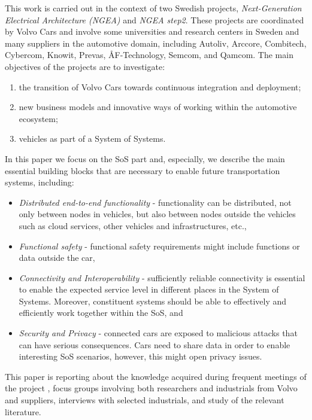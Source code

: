 This work is carried out in the context of two Swedish projects, {\em Next-Generation Electrical Architecture (NGEA)} and {\em NGEA step2}. 
These projects are coordinated by Volvo Cars and involve some universities and research centers in Sweden and many suppliers in the automotive domain, including Autoliv, Arccore, Combitech, Cybercom, Knowit, Prevas, \AA F-Technology, Semcom, and Qamcom. %
The main objectives of the projects are to investigate:
	\begin{enumerate} %
		\item the transition of Volvo Cars towards continuous integration and deployment;
		\item new business models and innovative ways of working within the automotive ecosystem; 
		\item vehicles as part of a System of Systems.
	\end{enumerate}


In this paper we focus on the SoS part and, especially, we describe the main essential building blocks that are necessary to enable future transportation systems, including: 

\begin{itemize}
\item {\em Distributed end-to-end functionality} - functionality can be distributed, not only between nodes in vehicles, but also between nodes outside the vehicles such as cloud services, other vehicles and infrastructures, etc., 
\item {\em Functional safety} - functional safety requirements might include functions or data outside the car, 
\item {\em Connectivity and Interoperability} - sufficiently reliable connectivity is essential to enable the expected service level in different places in the System of Systems. Moreover, constituent systems should be able to effectively and efficiently work together within the SoS, and 
\item {\em Security and Privacy} - connected cars are exposed to malicious attacks that can have serious consequences. Cars need to share data in order to enable interesting SoS scenarios, however, this might open privacy issues.
\end{itemize}

This paper is reporting about the knowledge acquired during frequent meetings of the project , focus groups involving both researchers and industrials from Volvo and suppliers, interviews with selected industrials, and study of the relevant literature.

